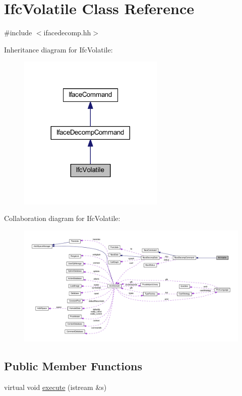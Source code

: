 \hypertarget{class_ifc_volatile}{}\section{Ifc\+Volatile Class Reference}
\label{class_ifc_volatile}


{\ttfamily \#include $<$ifacedecomp.\+hh$>$}



Inheritance diagram for Ifc\+Volatile\+:
\nopagebreak
\begin{figure}[H]
\begin{center}
\leavevmode
\includegraphics[width=197pt]{class_ifc_volatile__inherit__graph}
\end{center}
\end{figure}


Collaboration diagram for Ifc\+Volatile\+:
\nopagebreak
\begin{figure}[H]
\begin{center}
\leavevmode
\includegraphics[width=350pt]{class_ifc_volatile__coll__graph}
\end{center}
\end{figure}
\subsection*{Public Member Functions}
\begin{DoxyCompactItemize}
\item 
virtual void \mbox{\hyperlink{class_ifc_volatile_a41bd6c55a0838a7c46925e1a2409fb9f}{execute}} (istream \&s)
\end{DoxyCompactItemize}
